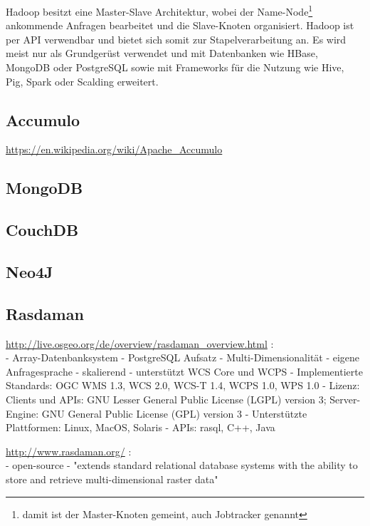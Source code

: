 Hadoop besitzt eine Master-Slave Architektur, wobei der Name-Node\footnote{damit ist der Master-Knoten gemeint, auch Jobtracker genannt} ankommende Anfragen bearbeitet und die Slave-Knoten organisiert.
Hadoop ist per API verwendbar und bietet sich somit zur Stapelverarbeitung an. %
Es wird meist nur als Grundgerüst verwendet und mit Datenbanken wie HBase, MongoDB oder PostgreSQL sowie mit Frameworks für die Nutzung wie Hive, Pig, Spark oder Scalding erweitert.





\subsection{Accumulo}
\url{https://en.wikipedia.org/wiki/Apache_Accumulo}

\subsection{MongoDB}

\subsection{CouchDB}

\subsection{Neo4J}

\newpage

\subsection{Rasdaman}

\url{http://live.osgeo.org/de/overview/rasdaman_overview.html} :\\
- Array-Datenbanksystem
- PostgreSQL Aufsatz
- Multi-Dimensionalität
- eigene Anfragesprache
- skalierend
- unterstützt WCS Core und WCPS
- Implementierte Standards: OGC WMS 1.3, WCS 2.0, WCS-T 1.4, WCPS 1.0, WPS 1.0
- Lizenz: Clients und APIs: GNU Lesser General Public License (LGPL) version 3; Server-Engine: GNU General Public License (GPL) version 3
- Unterstützte Plattformen: Linux, MacOS, Solaris
- APIs: rasql, C++, Java


\url{http://www.rasdaman.org/} :\\
- open-source
- "extends standard relational database systems with the ability to store and retrieve multi-dimensional raster data"


